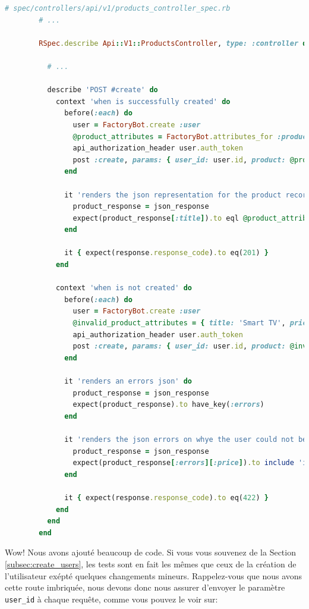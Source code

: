 \documentclass[]{report}
\begin{document}
      \begin{scriptsize}
        \begin{lstlisting}[language=ruby, caption={Test de la création d'un produit}, label={lst:create_create_products_controller_spec}]
        # spec/controllers/api/v1/products_controller_spec.rb
        # ...

        RSpec.describe Api::V1::ProductsController, type: :controller do

          # ...

          describe 'POST #create' do
            context 'when is successfully created' do
              before(:each) do
                user = FactoryBot.create :user
                @product_attributes = FactoryBot.attributes_for :product
                api_authorization_header user.auth_token
                post :create, params: { user_id: user.id, product: @product_attributes }
              end

              it 'renders the json representation for the product record just created' do
                product_response = json_response
                expect(product_response[:title]).to eql @product_attributes[:title]
              end

              it { expect(response.response_code).to eq(201) }
            end

            context 'when is not created' do
              before(:each) do
                user = FactoryBot.create :user
                @invalid_product_attributes = { title: 'Smart TV', price: 'Twelve dollars' }
                api_authorization_header user.auth_token
                post :create, params: { user_id: user.id, product: @invalid_product_attributes }
              end

              it 'renders an errors json' do
                product_response = json_response
                expect(product_response).to have_key(:errors)
              end

              it 'renders the json errors on whye the user could not be created' do
                product_response = json_response
                expect(product_response[:errors][:price]).to include 'is not a number'
              end

              it { expect(response.response_code).to eq(422) }
            end
          end
        end
        \end{lstlisting}
      \end{scriptsize}


      Wow! Nous avons ajouté beaucoup de code. Si vous vous souvenez de la Section \ref{subsec:create_users}, les tests sont en fait les mêmes que ceux de la création de l'utilisateur exépté quelques changements mineurs. Rappelez-vous que nous avons cette route imbriquée, nous devons donc nous assurer d'envoyer le paramètre \verb|user_id| à chaque requête, comme vous pouvez le voir sur:
\end{document}
